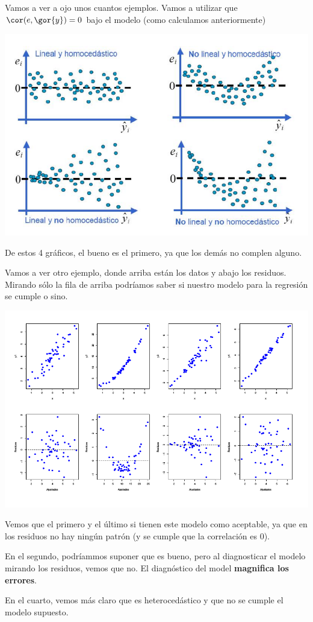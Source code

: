 \begin{example}
Vamos a ver a ojo unos cuantos ejemplos. Vamos a utilizar que $\cor(e,\gor{y}) = 0$ bajo el modelo (como calculamos anteriormente)

\begin{center}
\includegraphics[scale=0.6]{img/diagmodelo.png}
\end{center}

De estos 4 gráficos, el bueno es el primero, ya que los demás no complen alguno.
\end{example}

\begin{example}
Vamos a ver otro ejemplo, donde arriba están los datos y abajo los residuos. Mirando sólo la fila de arriba podríamos saber si nuestro modelo para la regresión se cumple o sino.


\begin{center}
\includegraphics[scale=0.6]{img/diagmodelo_2.png}
\end{center}

Vemos que el primero y el último si tienen este modelo como aceptable, ya que en los residuos no hay ningún patrón (y se cumple que la correlación es 0).

En el segundo, podríammos suponer que es bueno, pero al diagnosticar el modelo mirando los residuos, vemos que no. El diagnóstico del model \textbf{magnifica los errores}.

En el cuarto, vemos más claro que es heterocedástico y que no se cumple el modelo supuesto.
\end{example}

